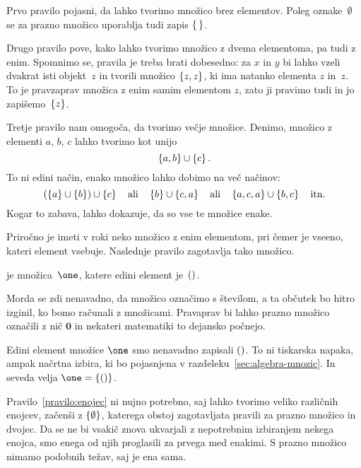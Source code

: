 Prvo pravilo pojasni, da lahko tvorimo množico brez elementov.
Poleg oznake~$\emptyset$ se za prazno množico uporablja tudi zapis $\left\{\,\right\}$.

Drugo pravilo pove, kako lahko tvorimo množico z dvema elementoma, pa tudi z enim.
Spomnimo se, pravila je treba brati dobesedno: za $x$ in $y$ bi lahko vzeli dvakrat isti
objekt~$z$ in tvorili množico $\left\{z, z\right\}$, ki ima natanko elementa $z$ in~$z$. To je
pravzaprav množica z enim samim elementom $z$, zato ji pravimo tudi  in jo
zapišemo~$\left\{z\right\}$.

Tretje pravilo nam omogoča, da tvorimo večje množice. Denimo, množico z elementi $a$, $b$,
$c$ lahko tvorimo kot unijo
%
\begin{equation*}
  \left\{a, b\right\} \cup \left\{c\right\}.
\end{equation*}
%
To ni edini način, enako množico lahko dobimo na več načinov:
%
\begin{equation*}
  (\left\{a\right\} \cup \left\{b\right\}) \cup \left\{c\right\}
  \quad\text{ali}\quad
  \left\{b\right\} \cup \left\{c, a\right\}
  \quad\text{ali}\quad
  \left\{a,c,a\right\} \cup \left\{b,c\right\}
  \quad\text{itn.}
\end{equation*}
%
Kogar to zabava, lahko dokazuje, da so vse te množice enake.

Priročno je imeti v roki neko množico z enim elementom, pri čemer je vseeno, kateri element vsebuje.
%
Naslednje pravilo zagotavlja tako množico.

\begin{pravilo}
  \label{pravilo:enojec}
   je množica~$\one$, katere edini element je~$()$.
\end{pravilo}

Morda se zdi nenavadno, da množico označimo s številom, a ta občutek bo hitro izginil, ko
bomo računali z množicami. Pravaprav bi lahko prazno množico označili z nič $\mathbf{0}$
in nekateri matematiki to dejansko počnejo.

Edini element množice $\one$ smo nenavadno zapisali $()$. To ni tiskarska napaka,
ampak načrtna izbira, ki bo pojasnjena v razdeleku~\ref{sec:algebra-mnozic}.
In seveda velja $\one = \set{\unit}$.

Pravilo~\ref{pravilo:enojec} ni nujno potrebno, saj lahko tvorimo veliko različnih enojcev,
začenši z $\left\{\emptyset\right\}$, katerega obstoj zagotavljata pravili za prazno množico in dvojec.
Da se ne bi vsakič znova ukvarjali z nepotrebnim izbiranjem nekega enojca, smo enega od njih
proglasili za prvega med enakimi. S prazno množico nimamo podobnih težav, saj je ena sama.

